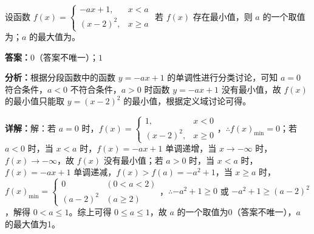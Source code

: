 \begin{question}[points=5]
设函数 $f(x) = \begin{cases} -ax+1, & x < a \\ (x-2)^2, & x \geq a \end{cases}$ 若 $f(x)$ 存在最小值，则 $a$ 的一个取值为；$a$ 的最大值为。
\fillin[{$0$（答案不唯一）；$1$}]
\begin{solution}
\textbf{答案：}$0$（答案不唯一）；$1$

\textbf{分析：}根据分段函数中的函数 $y = -ax+1$ 的单调性进行分类讨论，可知 $a=0$ 符合条件，$a<0$ 不符合条件，$a>0$ 时函数 $y=-ax+1$ 没有最小值，故 $f(x)$ 的最小值只能取 $y=(x-2)^2$ 的最小值，根据定义域讨论可得。

\textbf{详解：}解：若 $a=0$ 时，$f(x)=\begin{cases} 1, & x<0 \\ (x-2)^2, & x\geq 0 \end{cases}$，$\therefore f(x)_{\min}=0$；若 $a<0$ 时，当 $x<a$ 时，$f(x)=-ax+1$ 单调递增，当 $x\to -\infty$ 时，$f(x)\to -\infty$，故 $f(x)$ 没有最小值；若 $a>0$ 时，当 $x<a$ 时，$f(x)=-ax+1$ 单调递减，$f(x) > f(a) = -a^2+1$，当 $x\geq a$ 时，$f(x)_{\min}=\begin{cases} 0 & (0<a<2) \\ (a-2)^2 & (a\geq 2) \end{cases}$，$\therefore -a^2+1\geq 0$ 或 $-a^2+1\geq (a-2)^2$，解得 $0<a\leq 1$。综上可得 $0\leq a\leq 1$，故 $a$ 的一个取值为0（答案不唯一），$a$ 的最大值为1。
\end{solution}
\end{question}

